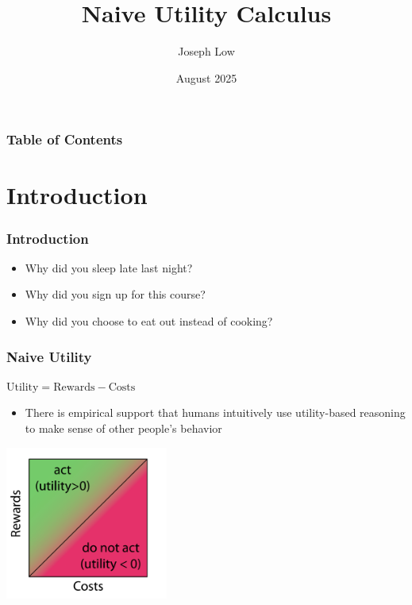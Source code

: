 \documentclass{beamer}
\title{Naive Utility Calculus}
\author{Joseph Low}
\date{August 2025}
\begin{document}
\frame{\titlepage}

\begin{frame}
\frametitle{Table of Contents}
\tableofcontents
\end{frame}

\section{Introduction}
\begin{frame}
\frametitle{Introduction}
\vfill
\begin{center}
\end{center}
\vfill

\pause

\begin{itemize}
    \item<2-> Why did you sleep late last night?
    \pause
    \item<3-> Why did you sign up for this course?
    \pause
    \item<4-> Why did you choose to eat out instead of cooking?
\end{itemize}
\end{frame}

\begin{frame}
\frametitle{Naive Utility}
\begin{center}
\Large $\text{Utility} = \text{Rewards} - \text{Costs}$
\end{center}
\vspace{0.5cm}
\begin{itemize}
    \item There is empirical support that humans intuitively use utility-based reasoning to make sense of other people's behavior
\end{itemize}
\vspace{0.5cm}
\begin{center}
\includegraphics[width=0.4\textwidth]{utility1.png}
\end{center}
\end{frame}
\end{document}

